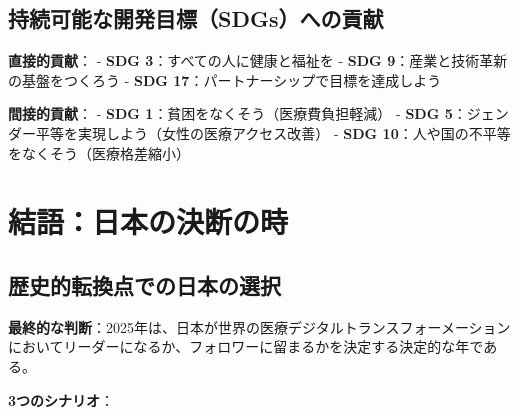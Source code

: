 \documentclass[
  a4paper,
  a4paper,
  11pt]{ltjsbook}
\begin{document}
\subsection{持続可能な開発目標（SDGs）への貢献}\label{ux6301ux7d9aux53efux80fdux306aux958bux767aux76eeux6a19sdgsux3078ux306eux8ca2ux732e}

\textbf{直接的貢献}： - \textbf{SDG 3}：すべての人に健康と福祉を -
\textbf{SDG 9}：産業と技術革新の基盤をつくろう - \textbf{SDG
17}：パートナーシップで目標を達成しよう

\textbf{間接的貢献}： - \textbf{SDG 1}：貧困をなくそう（医療費負担軽減）
- \textbf{SDG 5}：ジェンダー平等を実現しよう（女性の医療アクセス改善） -
\textbf{SDG 10}：人や国の不平等をなくそう（医療格差縮小）

\section{結語：日本の決断の時}\label{ux7d50ux8a9eux65e5ux672cux306eux6c7aux65adux306eux6642}

\subsection{歴史的転換点での日本の選択}\label{ux6b74ux53f2ux7684ux8ee2ux63dbux70b9ux3067ux306eux65e5ux672cux306eux9078ux629e}

\begin{tcolorbox}[enhanced jigsaw, toprule=.15mm, bottomtitle=1mm, coltitle=black, left=2mm, opacityback=0, arc=.35mm, colbacktitle=quarto-callout-important-color!10!white, colback=white, opacitybacktitle=0.6, bottomrule=.15mm, rightrule=.15mm, breakable, title=\textcolor{quarto-callout-important-color}{\faExclamation}\hspace{0.5em}{Important}, toptitle=1mm, titlerule=0mm, colframe=quarto-callout-important-color-frame, leftrule=.75mm]

\textbf{最終的な判断}：2025年は、日本が世界の医療デジタルトランスフォーメーションにおいてリーダーになるか、フォロワーに留まるかを決定する決定的な年である。

\end{tcolorbox}

\textbf{3つのシナリオ}：
\end{document}
